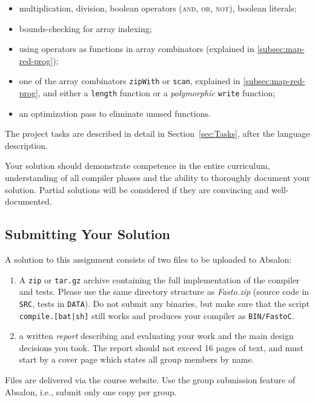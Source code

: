 \documentclass[a4paper,11pt]{article}
\begin{document}
\begin{itemize}
\setlength{\itemsep}{0.1ex}

\item multiplication, division, boolean operators 
(\textsc{and}, \textsc{or}, \textsc{not}), boolean literals;
%
\item bounds-checking for array indexing;
%
\item using operators as functions in array combinators
(explained in \ref{subsec:map-red-prog});
%
\item one of the array combinators \texttt{zipWith} or 
\texttt{scan}, explained in \ref{subsec:map-red-prog}, 
and either a \texttt{length} function or a \emph{polymorphic} 
\texttt{write} function;
\item an optimization pass to eliminate unused functions.
\end{itemize}
The project tasks are described in detail in Section~\ref{sec:Tasks}, after the 
language description.

\noindent
Your solution should demonstrate competence in the entire curriculum,
understanding of all compiler phases and the ability to thoroughly document your
solution. 
%
Partial solutions will be considered if they are convincing and well-documented.

\subsection*{Submitting Your Solution}

A solution to this assignment consists of two files to be uploaded to Absalon:
\begin{enumerate}
\item A \texttt{zip} or \texttt{tar.gz} archive containing the full implementation 
	of the compiler and tests. Please use the same directory structure as 
	\emph{Fasto.zip} (source code in \texttt{SRC}, tests in \texttt{DATA}).
	Do not submit any binaries, but make sure that the script 
	\texttt{compile.[bat|sh]} still works and produces your compiler as {\tt BIN/FastoC}.
\item a written \emph{report} describing and evaluating your work and the main design 
	decisions you took. %
	The report should not exceed 16 pages of text, and must start by a 
	cover page which states all group members by name.
\end{enumerate} 

Files are delivered via the course website. Use the group submission
feature of Absalon, i.e., submit only one copy per group.
\end{document}
